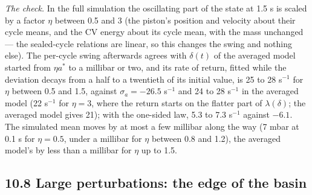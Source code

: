 \documentclass[11pt]{article}
\begin{document}
\emph{The check.} In the full simulation the oscillating part of the state at 1.5 s is scaled by a factor $\eta$ between 0.5 and 3 (the piston's position and velocity about their cycle means, and the CV energy about its cycle mean, with the mass unchanged --- the sealed-cycle relations are linear, so this changes the swing and nothing else). The per-cycle swing afterwards agrees with $\delta(t)$ of the averaged model started from $\eta a^*$ to a millibar or two, and its rate of return, fitted while the deviation decays from a half to a twentieth of its initial value, is 25 to 28 s$^{-1}$ for $\eta$ between 0.5 and 1.5, against $\sigma_a = -26.5$ s$^{-1}$ and 24 to 28 s$^{-1}$ in the averaged model (22 s$^{-1}$ for $\eta = 3$, where the return starts on the flatter part of $\lambda(\delta)$; the averaged model gives 21); with the one-sided law, 5.3 to 7.3 s$^{-1}$ against $-6.1$. The simulated mean moves by at most a few millibar along the way (7 mbar at 0.1 s for $\eta = 0.5$, under a millibar for $\eta$ between 0.8 and 1.2), the averaged model's by less than a millibar for $\eta$ up to 1.5.

\subsection*{10.8 Large perturbations: the edge of the basin}
\end{document}
